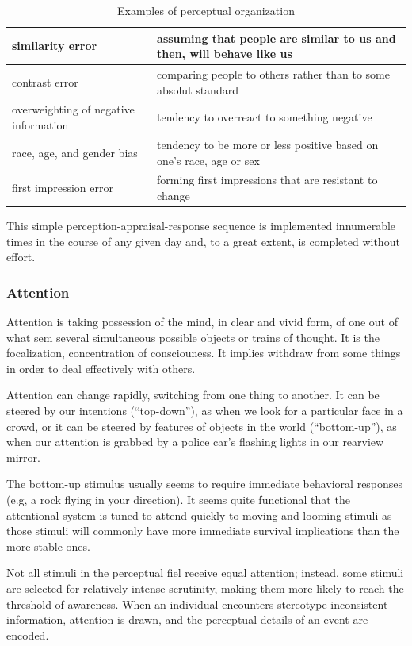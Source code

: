 \documentclass[12pt,article,oneside,a4paper]{memoir}
\begin{document}
\begin{table}
  \begin{tabular}{ p{5cm} |  p{10cm} }
    \hline
    similarity error & assuming that people are similar to us and then, will
    behave like us \\ \hline
    contrast error & comparing people to others rather than to some absolut
    standard \\ \hline
    overweighting of negative information & tendency to overreact to something
    negative \\ \hline
    race, age, and gender bias & tendency to be more or less positive based on
    one's race, age or sex \\ \hline
	first impression error & forming first impressions that are resistant to
	change \\ 
    \hline
  \end{tabular}
  \caption{Examples of perceptual organization}
  \label{table:accuracy-judgment}
\end{table}

This simple perception-appraisal-response sequence is implemented innumerable
times in the course of any given day and, to a great extent, is completed
without effort.

\subsubsection{Attention}
Attention is taking possession of the mind, in clear and vivid form, of one out
of what sem several simultaneous possible objects or trains of thought. It is
the focalization, concentration of consciouness. It implies withdraw from some
things in order to deal effectively with others.

Attention can change rapidly, switching from one thing to another. It can be
steered by our intentions (``top-down''), as when we look for a particular face
in a crowd, or it can be steered by features of objects in the world
(``bottom-up''), as when our attention is grabbed by a police car's flashing
lights in our rearview mirror.

The bottom-up stimulus usually seems to require immediate behavioral responses (e.g, a rock flying in your direction). It seems quite functional that the attentional system is tuned to attend quickly to moving and looming stimuli as those stimuli will commonly have more immediate survival implications than the more stable ones.

Not all stimuli in the perceptual fiel receive equal attention; instead, some stimuli are selected for relatively intense scrutinity, making them more likely to reach the threshold of awareness. When an individual encounters stereotype-inconsistent information, attention is drawn, and the perceptual details of an event are encoded.
\end{document}
